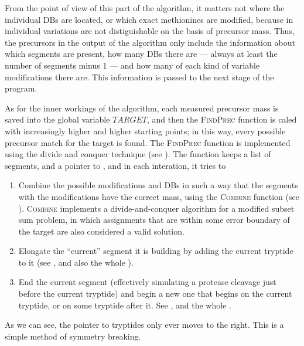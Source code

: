 From the point of view of this part of the algorithm, it matters not where the individual DBs are located, or which exact methionines are modified, because in individual variations are not distiguishable on the basis of precursor mass. Thus, the precursors in the output of the algorithm only include the information about which segments are present, how many DBs there are --- always at least the number of segments minus 1 --- and how many of each kind of variable modifications there are. This information is passed to the next stage of the program.

As for the inner workings of the algorithm, each measured precursor mass is saved into the global variable \(TARGET\), and then the \textsc{FindPrec} function is caled with increasingly higher and higher starting points; in this way, every possible precursor match for the target is found. The \textsc{FindPrec} function is implemented using the divide and conquer technique (see ). The function keeps a list of  segments, and a pointer to , and in each interation, it tries to

\begin{enumerate}
	\item Combine the possible modifications and DBs in such a way that the  segments with the modifications have the correct mass, using the \textsc{Combine} function (see ). \textsc{Combine} implements a divide-and-conquer algorithm for a modified subset sum problem, in which assignments that are within some error boundary of the target are also considered a valid solution.
	\item Elongate the ``current'' segment it is building by adding the current tryptide to it (see , and also the whole ).
	\item End the current segment (effectively simulating a protease cleavage just before the current tryptide) and begin a new one that begins on the current tryptide, or on some tryptide after it. See , and the whole .
\end{enumerate}

As we can see, the pointer to tryptides only ever moves to the right. This is a simple method of symmetry breaking.

